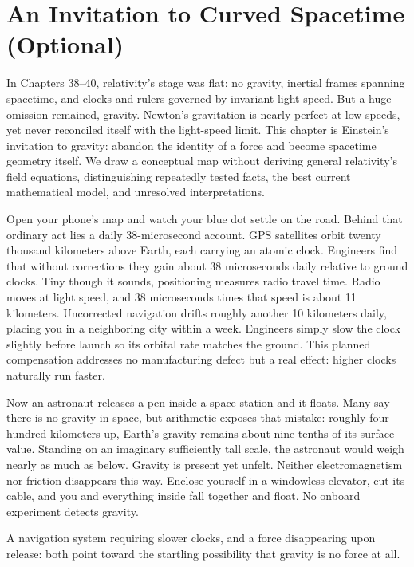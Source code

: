 \chapter{An Invitation to Curved Spacetime (Optional)}

In Chapters 38--40, relativity's stage was flat: no gravity, inertial frames spanning spacetime, and clocks and rulers governed by invariant light speed. But a huge omission remained, gravity. Newton's gravitation is nearly perfect at low speeds, yet never reconciled itself with the light-speed limit. This chapter is Einstein's invitation to gravity: abandon the identity of a force and become spacetime geometry itself. We draw a conceptual map without deriving general relativity's field equations, distinguishing repeatedly tested facts, the best current mathematical model, and unresolved interpretations.


\begin{mainline}
Open your phone's map and watch your blue dot settle on the road. Behind that ordinary act lies a daily 38-microsecond account. GPS satellites orbit twenty thousand kilometers above Earth, each carrying an atomic clock. Engineers find that without corrections they gain about 38 microseconds daily relative to ground clocks. Tiny though it sounds, positioning measures radio travel time. Radio moves at light speed, and 38 microseconds times that speed is about 11 kilometers. Uncorrected navigation drifts roughly another 10 kilometers daily, placing you in a neighboring city within a week. Engineers simply slow the clock slightly before launch so its orbital rate matches the ground. This planned compensation addresses no manufacturing defect but a real effect: higher clocks naturally run faster.

Now an astronaut releases a pen inside a space station and it floats. Many say there is no gravity in space, but arithmetic exposes that mistake: roughly four hundred kilometers up, Earth's gravity remains about nine-tenths of its surface value. Standing on an imaginary sufficiently tall scale, the astronaut would weigh nearly as much as below. Gravity is present yet unfelt. Neither electromagnetism nor friction disappears this way. Enclose yourself in a windowless elevator, cut its cable, and you and everything inside fall together and float. No onboard experiment detects gravity.

A navigation system requiring slower clocks, and a force disappearing upon release: both point toward the startling possibility that gravity is no force at all.
\end{mainline}

